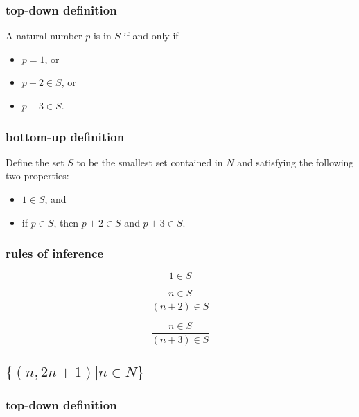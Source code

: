 \documentclass[11pt,a4paper]{article}
\begin{document}
\subsubsection{top-down definition}

A natural number $p$ is in $S$ if and only if

\begin{itemize}
    \item{$p=1$, or}
    \item{$p-2 \in S$, or}
    \item{$p-3 \in S$.}
\end{itemize}

\subsubsection{bottom-up definition}

Define the set $S$ to be the smallest set contained in $N$
and satisfying the following two properties:

\begin{itemize}
    \item{$1 \in S$, and}
    \item{if $p \in S$, then $p+2 \in S$ and $p+3 \in S$.}
\end{itemize}

\subsubsection{rules of inference}

\begin{equation*}
    1 \in S
\end{equation*}

\begin{equation*}
    \frac{n \in S}{(n+2) \in S}
\end{equation*}

\begin{equation*}
    \frac{n \in S}{(n+3) \in S}
\end{equation*}

\subsection{$\{(n,2n+1)| n \in N\}$}

\subsubsection{top-down definition}
\end{document}
